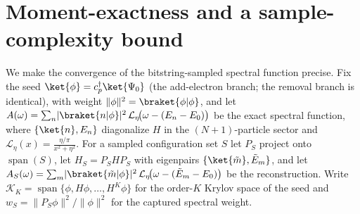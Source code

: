 \section{Moment-exactness and a sample-complexity bound}
\label{app:b2}

We make the convergence of the bitstring-sampled spectral function precise. Fix the seed
$\ket{\phi}=c^{\dagger}_{p}\ket{\Psi_0}$ (the add-electron branch; the removal branch is identical),
with weight $\lVert\phi\rVert^{2}=\braket{\phi|\phi}$, and let
$A(\omega)=\sum_{n}\lvert\braket{n|\phi}\rvert^{2}\,\mathcal{L}_{\eta}\!\big(\omega-(E_n-E_0)\big)$
be the exact spectral function, where $\{\ket{n},E_n\}$ diagonalize $H$ in the $(N\!+\!1)$-particle
sector and $\mathcal{L}_{\eta}(x)=\tfrac{\eta/\pi}{x^{2}+\eta^{2}}$. For a sampled configuration set
$S$ let $P_S$ project onto $\operatorname{span}(S)$, let $H_S=P_SHP_S$ with eigenpairs
$\{\ket{\tilde m},\tilde E_m\}$, and let
$A_S(\omega)=\sum_{m}\lvert\braket{\tilde m|\phi}\rvert^{2}\,\mathcal{L}_{\eta}\!\big(\omega-(\tilde E_m-E_0)\big)$
be the reconstruction. Write $\mathcal{K}_K=\operatorname{span}\{\phi,H\phi,\dots,H^{K}\phi\}$ for the
order-$K$ Krylov space of the seed and $w_S=\lVert P_S\phi\rVert^{2}/\lVert\phi\rVert^{2}$ for the
captured spectral weight.

